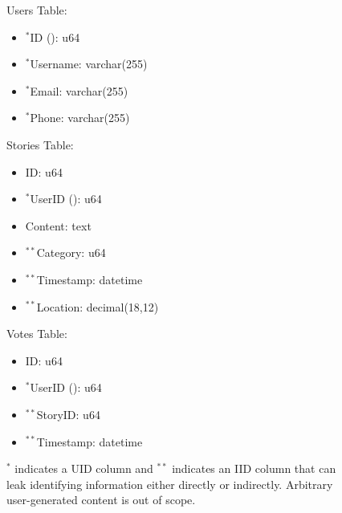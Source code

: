 \begin{figure*}
    \centering
\begin{minipage}[t]{0.3\textwidth}
Users Table:
\begin{itemize}
    \item $^*$ID (\uidkey{}): u64
    \item $^*$Username: varchar(255) 
    \item $^*$Email: varchar(255) 
    \item $^*$Phone: varchar(255)
\end{itemize}
\end{minipage}
\begin{minipage}[t]{0.3\textwidth}
Stories Table:
\begin{itemize}
    \item ID: u64
    \item $^*$UserID (\uidkey{}): u64
    \item Content: text 
    \item $^{**}$Category: u64
    \item $^{**}$Timestamp: datetime
    \item $^{**}$Location: decimal(18,12)
\end{itemize}
\end{minipage}
\begin{minipage}[t]{0.3\textwidth}
Votes Table:
\begin{itemize}
    \item ID: u64
    \item $^*$UserID (\uidkey{}): u64
    \item $^{**}$StoryID: u64
    \item $^{**}$Timestamp: datetime
\end{itemize}
\end{minipage}
\caption{$^*$ indicates a UID column and $^{**}$ indicates an IID column that can leak identifying information either directly or indirectly.
Arbitrary user-generated content is out of scope.}
\label{fig:app}
\hrulefill
\end{figure*}

